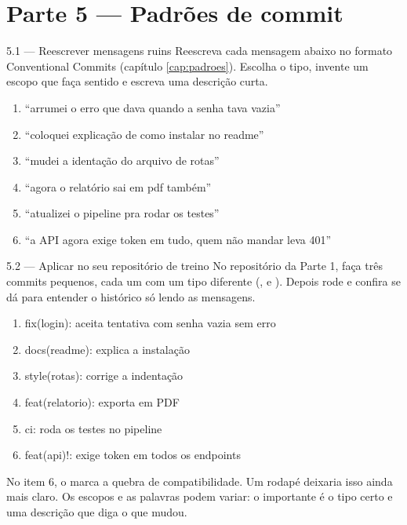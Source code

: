 \section{Parte 5 — Padrões de commit}

\begin{exercicio}{5.1 — Reescrever mensagens ruins}
Reescreva cada mensagem abaixo no formato Conventional Commits (capítulo \ref{cap:padroes}). Escolha o tipo, invente um escopo que faça sentido e escreva uma descrição curta.
\begin{enumerate}
  \item \enquote{arrumei o erro que dava quando a senha tava vazia}
  \item \enquote{coloquei explicação de como instalar no readme}
  \item \enquote{mudei a identação do arquivo de rotas}
  \item \enquote{agora o relatório sai em pdf também}
  \item \enquote{atualizei o pipeline pra rodar os testes}
  \item \enquote{a API agora exige token em tudo, quem não mandar leva 401}
\end{enumerate}
\end{exercicio}

\begin{exercicio}{5.2 — Aplicar no seu repositório de treino}
No repositório  da Parte 1, faça três commits pequenos, cada um com um tipo diferente (,  e ). Depois rode  e confira se dá para entender o histórico só lendo as mensagens.
\end{exercicio}

\begin{tcolorbox}[base, colback=cinzaSuave, colframe=cinzaSuave, title={\faKey\enspace Respostas possíveis do 5.1}, coltitle=azulMB, attach title to upper={\\[2pt]}]
\ttfamily\small
\begin{enumerate}
  \item fix(login): aceita tentativa com senha vazia sem erro
  \item docs(readme): explica a instalação
  \item style(rotas): corrige a indentação
  \item feat(relatorio): exporta em PDF
  \item ci: roda os testes no pipeline
  \item feat(api)!: exige token em todos os endpoints
\end{enumerate}
\rmfamily\normalsize
No item 6, o \arq{!} marca a quebra de compatibilidade. Um rodapé  deixaria isso ainda mais claro. Os escopos e as palavras podem variar: o importante é o tipo certo e uma descrição que diga o que mudou.
\end{tcolorbox}

